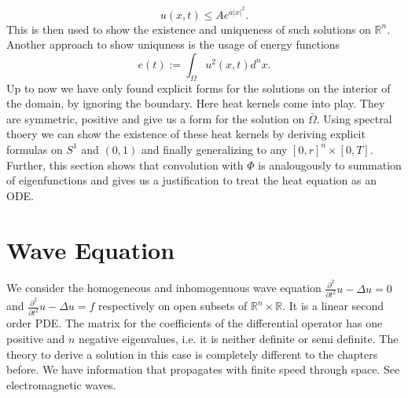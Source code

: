 \documentclass[A4,12pt,twoside]{book}
\begin{document}
\[
u(x,t) \leq A e^{a|x|^2}.
\]
This is then used to show the existence and uniqueness of such solutions on $\mathbb{R}^n$.\\
Another approach to show uniquness is the usage of energy functions 
\[
e(t) := \int_\Omega u^2 (x,t) d^n x.
\]
Up to now we have only found explicit forms for the solutions on the interior of the domain, by ignoring the boundary. Here heat kernels come into play. They are symmetric, positive and give us a form for the solution on $\bar{\Omega}$. Using spectral thoery we can show the existence of these heat kernels by deriving explicit formulas on $S^1$ and $(0,1)$ and finally generalizing to any $[0,r]^n \times [0,T]$. Further, this section shows that convolution with $\Phi$ is analougously to summation of eigenfunctions and gives us a justification to treat the heat equation as an ODE.

\chapter{Wave Equation}

We consider the homogeneous and inhomogenuous wave equation $\frac{\partial^2}{\partial t^2} u - \Delta u=0$ and $\frac{\partial^2}{\partial t^2} u - \Delta u=f$ respectively on open subsets of $\mathbb{R}^n \times \mathbb{R}$. It is a linear second order PDE. The matrix for the coefficients of the differential operator has one positive and $n$ negative eigenvalues, i.e. it is neither definite or semi definite. The theory to derive a solution in this case is completely different to the chapters before. We have information that propagates with finite speed through space. See electromagnetic waves.
\end{document}
